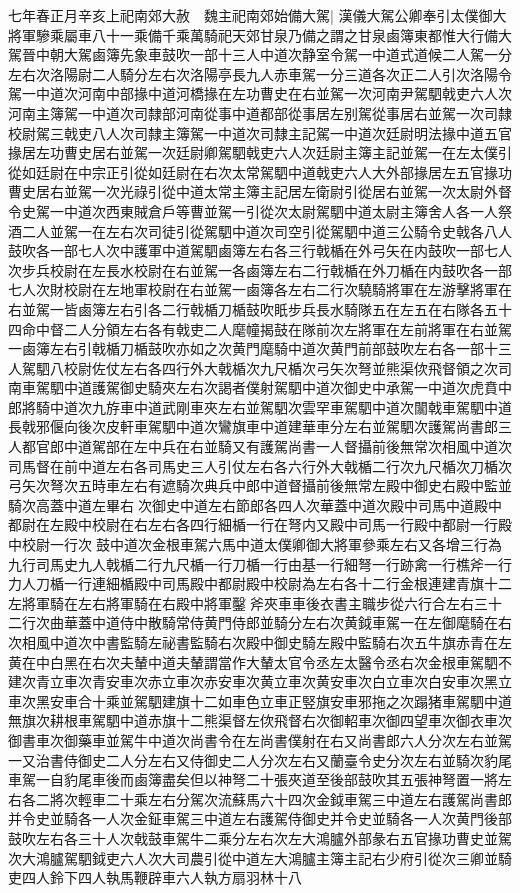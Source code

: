 七年春正月辛亥上祀南郊大赦　魏主祀南郊始備大駕|{
	漢儀大駕公卿奉引太僕御大將軍驂乘屬車八十一乘備千乘萬騎祀天郊甘泉乃備之謂之甘泉鹵簿東都惟大行備大駕晉中朝大駕鹵簿先象車鼓吹一部十三人中道次静室令駕一中道式道候二人駕一分左右次洛陽尉二人騎分左右次洛陽亭長九人赤車駕一分三道各次正二人引次洛陽令駕一中道次河南中部掾中道河橋掾在左功曹史在右並駕一次河南尹駕駟戟吏六人次河南主簿駕一中道次司隸部河南從事中道都部從事居左别駕從事居右並駕一次司隸校尉駕三戟吏八人次司隸主簿駕一中道次司隸主記駕一中道次廷尉明法掾中道五官掾居左功曹史居右並駕一次廷尉卿駕駟戟吏六人次廷尉主簿主記並駕一在左太僕引從如廷尉在中宗正引從如廷尉在右次太常駕駟中道戟吏六人大外部掾居左五官掾功曹史居右並駕一次光祿引從中道太常主簿主記居左衛尉引從居右並駕一次太尉外督令史駕一中道次西東賊倉戶等曹並駕一引從次太尉駕駟中道太尉主簿舍人各一人祭酒二人並駕一在左右次司徒引從駕駟中道次司空引從駕駟中道三公騎令史戟各八人鼓吹各一部七人次中護軍中道駕駟鹵簿左右各三行戟楯在外弓矢在内鼓吹一部七人次步兵校尉在左長水校尉在右並駕一各鹵簿左右二行戟楯在外刀楯在内鼓吹各一部七人次財校尉在左地軍校尉在右並駕一鹵簿各左右二行次驍騎將軍在左游擊將軍在右並駕一皆鹵簿左右引各二行戟楯刀楯鼓吹眂步兵長水騎隊五在左五在右隊各五十四命中督二人分領左右各有戟吏二人麾幢揭鼓在隊前次左將軍在左前將軍在右並駕一鹵簿左右引戟楯刀楯鼓吹亦如之次黄門麾騎中道次黄門前部鼓吹左右各一部十三人駕駟八校尉佐仗左右各四行外大戟楯次九尺楯次弓矢次弩並熊渠佽飛督領之次司南車駕駟中道護駕御史騎夾左右次謁者僕射駕駟中道次御史中承駕一中道次虎賁中郎將騎中道次九斿車中道武剛車夾左右並駕駟次雲罕車駕駟中道次闟戟車駕駟中道長戟邪偃向後次皮軒車駕駟中道次鸞旗車中道建華車分左右並駕駟次護駕尚書郎三人都官郎中道駕部在左中兵在右並騎又有護駕尚書一人督攝前後無常次相風中道次司馬督在前中道左右各司馬史三人引仗左右各六行外大戟楯二行次九尺楯次刀楯次弓矢次弩次五時車左右有遮騎次典兵中郎中道督攝前後無常左殿中御史右殿中監並騎次高蓋中道左畢右次御史中道左右節郎各四人次華蓋中道次殿中司馬中道殿中都尉在左殿中校尉在右左右各四行細楯一行在弩内又殿中司馬一行殿中都尉一行殿中校尉一行次鼓中道次金根車駕六馬中道太僕卿御大將軍參乘左右又各增三行為九行司馬史九人戟楯二行九尺楯一行刀楯一行由基一行細弩一行跡禽一行樵斧一行力人刀楯一行連細楯殿中司馬殿中都尉殿中校尉為左右各十二行金根連建青旗十二左將軍騎在左右將軍騎在右殿中將軍鑿斧夾車車後衣書主職步從六行合左右三十二行次曲華蓋中道侍中散騎常侍黄門侍郎並騎分左右次黄鉞車駕一在左御麾騎在右次相風中道次中書監騎左祕書監騎右次殿中御史騎左殿中監騎右次五牛旗赤青在左黄在中白黑在右次夫輦中道夫輦謂當作大輦太官令丞左太醫令丞右次金根車駕駟不建次青立車次青安車次赤立車次赤安車次黄立車次黄安車次白立車次白安車次黑立車次黑安車合十乘並駕駟建旗十二如車色立車正竪旗安車邪拖之次蹋猪車駕駟中道無旗次耕根車駕駟中道赤旗十二熊渠督左佽飛督右次御軺車次御四望車次御衣車次御書車次御藥車並駕牛中道次尚書令在左尚書僕射在右又尚書郎六人分次左右並駕一又治書侍御史二人分左右又侍御史二人分次左右又蘭臺令史分次左右並騎次豹尾車駕一自豹尾車後而鹵簿盡矣但以神弩二十張夾道至後部鼓吹其五張神弩置一將左右各二將次輕車二十乘左右分駕次流蘇馬六十四次金鉞車駕三中道左右護駕尚書郎并令史並騎各一人次金鉦車駕三中道左右護駕侍御史并令史並騎各一人次黄門後部鼓吹左右各三十人次戟鼓車駕牛二乘分左右次左大鴻臚外部彖右五官掾功曹史並駕次大鴻臚駕駟鉞吏六人次大司農引從中道左大鴻臚主簿主記右少府引從次三卿並騎吏四人鈴下四人執馬鞭辟車六人執方扇羽林十八}

